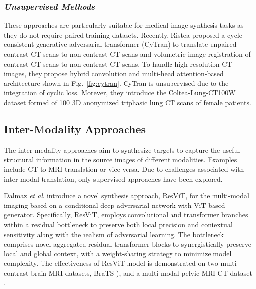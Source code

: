 \documentclass[10pt,journal,compsoc]{IEEEtran}
\begin{document}
\subsubsection{\textbf{\textit{Unsupervised Methods}}} These approaches are particularly suitable for medical image synthesis tasks as they do not require paired training datasets. Recently, Ristea \cite{ristea2021cytran} proposed a cycle-consistent generative adversarial transformer (CyTran) to translate unpaired contrast CT scans to non-contrast CT scans and volumetric image registration of contrast CT scans to non-contrast CT scans. To handle high-resolution CT images, they propose hybrid convolution and multi-head attention-based architecture shown in Fig.~\ref{fig:cytran}. CyTran is unsupervised due to the integration of cyclic loss. Morever, they introduce the Coltea-Lung-CT100W dataset formed of 100 3D anonymized triphasic lung CT scans of female patients.%

\subsection{Inter-Modality Approaches}

The inter-modality approaches aim to synthesize targets to capture the useful structural information in the source images of different modalities. Examples include CT to MRI translation or vice-versa. Due to challenges associated with inter-modal translation, only supervised approaches have been explored.

Dalmaz \textit{et al.} \cite{dalmaz2021resvit} introduce a novel synthesis approach, ResViT, for the multi-modal imaging based on a conditional deep adversarial network with ViT-based generator. Specifically, ResViT, employs convolutional and transformer branches within a residual bottleneck to preserve both local precision and contextual sensitivity along with the realism of adversarial learning. The bottleneck comprises novel aggregated residual transformer blocks to synergistically preserve local and global context, with a weight-sharing strategy to minimize model complexity. The effectiveness of ResViT model is demonstrated on two multi-contrast brain MRI datasets, BraTS \cite{menze2014multimodal}), and a multi-modal pelvic MRI-CT dataset \cite{nyholm2018mr}.
\end{document}

